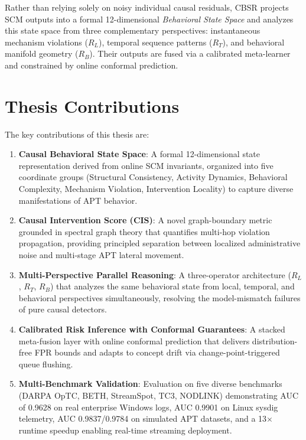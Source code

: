 Rather than relying solely on noisy individual causal residuals, CBSR projects SCM outputs
into a formal 12-dimensional \emph{Behavioral State Space} and analyzes this state space
from three complementary perspectives: instantaneous mechanism violations ($R_L$), temporal
sequence patterns ($R_T$), and behavioral manifold geometry ($R_B$). Their outputs are fused
via a calibrated meta-learner and constrained by online conformal prediction.

\section{Thesis Contributions}

The key contributions of this thesis are:

\begin{enumerate}
\item \textbf{Causal Behavioral State Space}: A formal 12-dimensional state representation
    derived from online SCM invariants, organized into five coordinate groups (Structural
    Consistency, Activity Dynamics, Behavioral Complexity, Mechanism Violation, Intervention
    Locality) to capture diverse manifestations of APT behavior.

\item \textbf{Causal Intervention Score (CIS)}: A novel graph-boundary metric grounded in
    spectral graph theory that quantifies multi-hop violation propagation, providing principled
    separation between localized administrative noise and multi-stage APT lateral movement.

\item \textbf{Multi-Perspective Parallel Reasoning}: A three-operator architecture ($R_L$,
    $R_T$, $R_B$) that analyzes the same behavioral state from local, temporal, and
    behavioral perspectives simultaneously, resolving the model-mismatch failures of pure
    causal detectors.

\item \textbf{Calibrated Risk Inference with Conformal Guarantees}: A stacked meta-fusion
    layer with online conformal prediction that delivers distribution-free FPR bounds and
    adapts to concept drift via change-point-triggered queue flushing.

\item \textbf{Multi-Benchmark Validation}: Evaluation on five diverse benchmarks (DARPA OpTC,
    BETH, StreamSpot, TC3, NODLINK) demonstrating AUC of 0.9628 on real enterprise Windows
    logs, AUC 0.9901 on Linux sysdig telemetry, AUC 0.9837/0.9784 on simulated APT datasets,
    and a 13$\times$ runtime speedup enabling real-time streaming deployment.
\end{enumerate}

